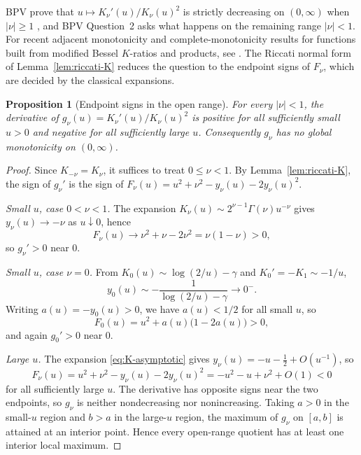 \documentclass[preprint,12pt]{elsarticle}
\theoremstyle{plain}
\newtheorem{proposition}[theorem]{Proposition}
\theoremstyle{definition}
\theoremstyle{remark}
\begin{document}
BPV prove that \(u\mapsto K_\nu'(u)/K_\nu(u)^2\) is strictly decreasing on
\((0,\infty)\) when \(|\nu|\ge1\) \cite[Theorem~2(a)]{bpv}, and BPV
Question~2 asks what happens on the remaining range \(|\nu|<1\). For recent
adjacent monotonicity and complete-monotonicity results for functions built
from modified Bessel \(K\)-ratios and products, see
\cite{yang-zheng-k,yang-chu-k,segura-2021,mao-tian-k}. The Riccati normal form of
Lemma~\ref{lem:riccati-K} reduces the question to the endpoint signs of
\(F_\nu\), which are decided by the classical expansions.

\begin{proposition}[Endpoint signs in the open range]\label{prop:K-nonmonotone}
For every \(|\nu|<1\), the derivative of
\(g_\nu(u)=K_\nu'(u)/K_\nu(u)^2\) is positive for all sufficiently small
\(u>0\) and negative for all sufficiently large \(u\). Consequently
\(g_\nu\) has no global monotonicity on \((0,\infty)\).
\end{proposition}
\begin{proof}
Since \(K_{-\nu}=K_\nu\), it suffices to treat \(0\le\nu<1\). By
Lemma~\ref{lem:riccati-K}, the sign of \(g_\nu'\) is the sign of
\(F_\nu(u)=u^2+\nu^2-y_\nu(u)-2y_\nu(u)^2\).

\emph{Small \(u\), case \(0<\nu<1\).} The expansion
\(K_\nu(u)\sim2^{\nu-1}\Gamma(\nu)u^{-\nu}\) gives
\(y_\nu(u)\to-\nu\) as \(u\downarrow0\), hence
\begin{equation}
F_\nu(u)\to\nu^2+\nu-2\nu^2=\nu(1-\nu)>0,
\end{equation}
so \(g_\nu'>0\) near \(0\).

\emph{Small \(u\), case \(\nu=0\).} From
\(K_0(u)\sim\log(2/u)-\gamma\) and \(K_0'=-K_1\sim-1/u\),
\begin{equation}
y_0(u)\sim-\frac{1}{\log(2/u)-\gamma}\longrightarrow0^-.
\end{equation}
Writing \(a(u)=-y_0(u)>0\), we have \(a(u)<1/2\) for all small \(u\), so
\begin{equation}
F_0(u)=u^2+a(u)\bigl(1-2a(u)\bigr)>0,
\end{equation}
and again \(g_0'>0\) near \(0\).

\emph{Large \(u\).} The expansion \eqref{eq:K-asymptotic} gives
\(y_\nu(u)=-u-\tfrac12+O(u^{-1})\), so
\begin{equation}
F_\nu(u)=u^2+\nu^2-y_\nu(u)-2y_\nu(u)^2=-u^2-u+\nu^2+O(1)<0
\end{equation}
for all sufficiently large \(u\). The derivative has opposite signs near the
two endpoints, so \(g_\nu\) is neither nondecreasing nor nonincreasing.
Taking \(a>0\) in the small-\(u\) region and \(b>a\) in the large-\(u\)
region, the maximum of \(g_\nu\) on \([a,b]\) is attained at an interior
point. Hence every open-range quotient has at least one interior local
maximum.
\end{proof}
\end{document}
